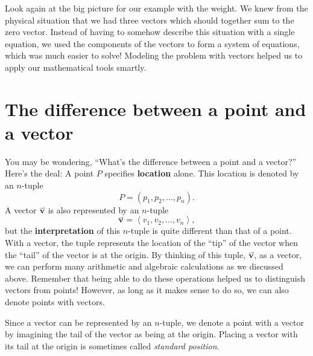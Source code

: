 \documentclass{ximera}
\begin{document}
Look again at the big picture for our example with the weight. 
We knew from the physical situation that we had three vectors which 
should together sum to the zero vector.  Instead of having to somehow 
describe this situation with a single equation, we used the components 
of the vectors to form a system of equations, which was much easier 
to solve! Modeling the problem with vectors helped us to apply our 
mathematical tools smartly.





\section{The difference between a point and a vector}

You may be wondering, ``What's the difference between a point and a
vector?'' Here's the deal: A point $P$ specifies \textbf{location}
alone. This location is denoted by an $n$-tuple
\[
P=(p_1,p_2,\dots,p_n).
\]
A vector $\overset{\rightharpoonup}{\mathbf{v}}$ is also represented by an $n$-tuple
\[
\overset{\rightharpoonup}{\mathbf{v}} = \left\langle v_1,v_2,\dots,v_n \right\rangle,
\]
but the \textbf{interpretation} of this $n$-tuple is quite different
than that of a point. With a vector, the tuple represents the location of the
``tip'' of the vector when the ``tail'' of the vector is at the
origin. By thinking of this tuple, $\overset{\rightharpoonup}{\mathbf{v}}$, as a vector, we can
perform many arithmetic and algebraic calculations as we discussed
above.  Remember that being able to do these operations helped us to 
distinguish vectors from points! However, as long as it makes sense to do so, we can also 
denote points with vectors.
\begin{image}
\end{image}
Since a vector can be represented by an $n$-tuple, we denote a point
with a vector by imagining the tail of the vector as being at the
origin. Placing a vector with its tail at the origin is sometimes
called \textit{standard position}.
\end{document}
